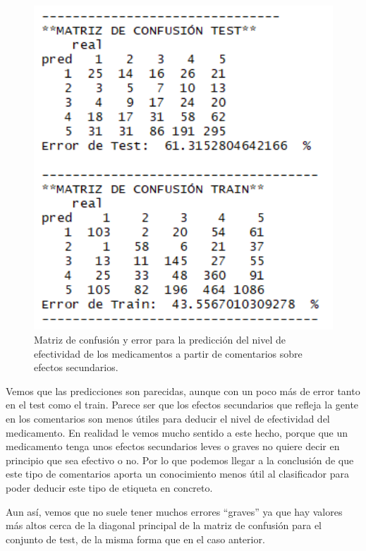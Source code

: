 \documentclass[spanish,]{article}
\begin{document}
\begin{figure}[h]
    \centering
    \includegraphics[width=1\textwidth]{figuras/Bayes/effects_effectivenessNumber.png}
    \caption{Matriz de confusión y error para la predicción del nivel de efectividad de los medicamentos a partir de comentarios sobre efectos secundarios.}
    \label{fig:bayes:figura2}
\end{figure}

Vemos que las predicciones son parecidas, aunque con un poco más de
error tanto en el test como el train. Parece ser que los efectos
secundarios que refleja la gente en los comentarios son menos útiles
para deducir el nivel de efectividad del medicamento. En realidad le
vemos mucho sentido a este hecho, porque que un medicamento tenga unos
efectos secundarios leves o graves no quiere decir en principio que sea
efectivo o no. Por lo que podemos llegar a la conclusión de que este
tipo de comentarios aporta un conocimiento menos útil al clasificador
para poder deducir este tipo de etiqueta en concreto.

Aun así, vemos que no suele tener muchos errores ``graves'' ya que hay
valores más altos cerca de la diagonal principal de la matriz de
confusión para el conjunto de test, de la misma forma que en el caso
anterior.
\end{document}

